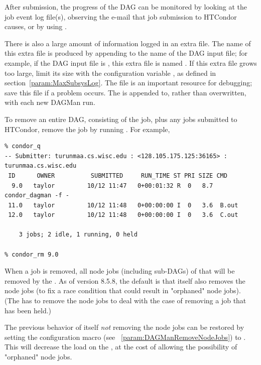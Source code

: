 
After submission, the progress of the DAG can be monitored
by looking at the job event log file(s),
observing the e-mail that job submission to HTCondor causes,
or by using  .

There is also a large amount of information logged in an extra file.
The name of this extra file is produced by appending
 to the name of the DAG input file; 
for example, if the DAG input file is , 
this extra file is named .
If this extra file grows too large, limit its size
with the configuration variable ,
as defined in section~\ref{param:MaxSubsysLog}.
The  file is an important resource for
debugging; save this file if a problem occurs. 
The  is appended to, rather than overwritten, 
with each new DAGMan run.

To remove an entire DAG, consisting of the  job, 
plus any jobs submitted to HTCondor,
remove the  job by running .
For example,
\footnotesize
\begin{verbatim}
% condor_q
-- Submitter: turunmaa.cs.wisc.edu : <128.105.175.125:36165> : turunmaa.cs.wisc.edu
 ID      OWNER          SUBMITTED     RUN_TIME ST PRI SIZE CMD
  9.0   taylor         10/12 11:47   0+00:01:32 R  0   8.7  condor_dagman -f -
 11.0   taylor         10/12 11:48   0+00:00:00 I  0   3.6  B.out
 12.0   taylor         10/12 11:48   0+00:00:00 I  0   3.6  C.out

    3 jobs; 2 idle, 1 running, 0 held

% condor_rm 9.0
\end{verbatim}
\normalsize

When a  job is removed, all node jobs (including sub-DAGs)
of that  will be removed by the .  As of version
8.5.8, the default is that  itself also removes the
node jobs (to fix a race condition that could result in "orphaned"
node jobs).  (The  has to remove the node jobs to deal with
the case of removing a  job that has been held.)

The previous behavior of  itself \emph{not} removing
the node jobs can be restored by setting the
 configuration macro
(see ~\ref{param:DAGManRemoveNodeJobs})
to .  This will decrease the load on the ,
at the cost of allowing the possibility of "orphaned" node jobs.

